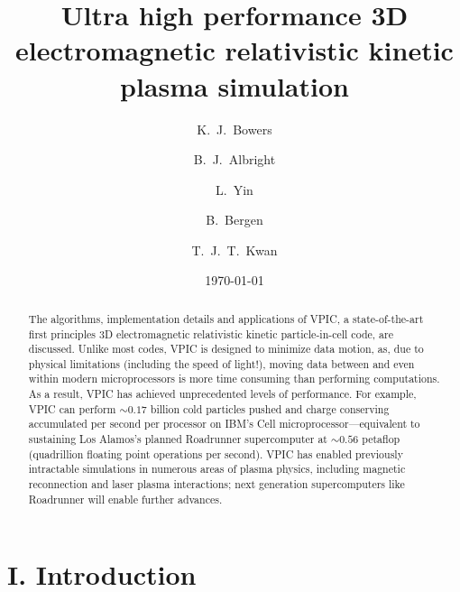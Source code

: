 \documentclass[aps,prl,preprint,preprintnumbers,groupedaddress]{revtex4}
\begin{document}

\title{Ultra high performance 3D electromagnetic relativistic kinetic plasma simulation}

\author{K.~J.~Bowers}
\author{B.~J.~Albright}
\author{L.~Yin}
\author{B.~Bergen}
\author{T.~J.~T.~Kwan}

\date{\today}

\begin{abstract}
The algorithms, implementation details and applications of VPIC, a
state-of-the-art first principles 3D electromagnetic relativistic
kinetic particle-in-cell code, are discussed.  Unlike most codes, VPIC
is designed to minimize data motion, as, due to physical limitations
(including the speed of light!), moving data between and even within
modern microprocessors is more time consuming than performing
computations.  As a result, VPIC has achieved unprecedented levels of
performance.  For example, VPIC can perform $\sim 0.17$ billion cold
particles pushed and charge conserving accumulated per second per
processor on IBM's Cell microprocessor---equivalent to sustaining Los
Alamos's planned Roadrunner supercomputer at $\sim 0.56$ petaflop
(quadrillion floating point operations per second).  VPIC has enabled
previously intractable simulations in numerous areas of plasma
physics, including magnetic reconnection and laser plasma
interactions; next generation supercomputers like Roadrunner will
enable further advances.
\end{abstract}

\maketitle

\section{I. Introduction}
\end{document}
